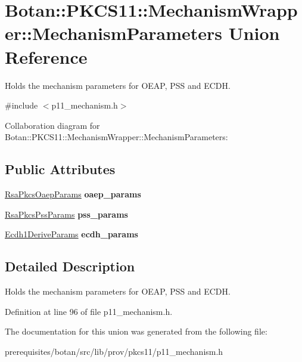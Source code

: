 \hypertarget{union_botan_1_1_p_k_c_s11_1_1_mechanism_wrapper_1_1_mechanism_parameters}{}\section{Botan\+:\+:P\+K\+C\+S11\+:\+:Mechanism\+Wrapper\+:\+:Mechanism\+Parameters Union Reference}
\label{union_botan_1_1_p_k_c_s11_1_1_mechanism_wrapper_1_1_mechanism_parameters}


Holds the mechanism parameters for O\+E\+AP, P\+SS and E\+C\+DH.  




{\ttfamily \#include $<$p11\+\_\+mechanism.\+h$>$}



Collaboration diagram for Botan\+:\+:P\+K\+C\+S11\+:\+:Mechanism\+Wrapper\+:\+:Mechanism\+Parameters\+:
\subsection*{Public Attributes}
\begin{DoxyCompactItemize}
\item 
\mbox{\label{union_botan_1_1_p_k_c_s11_1_1_mechanism_wrapper_1_1_mechanism_parameters_a9aee05d69e94972c32e7336b3aac55c9}} 
\mbox{\hyperlink{struct_c_k___r_s_a___p_k_c_s___o_a_e_p___p_a_r_a_m_s}{Rsa\+Pkcs\+Oaep\+Params}} {\bfseries oaep\+\_\+params}
\item 
\mbox{\label{union_botan_1_1_p_k_c_s11_1_1_mechanism_wrapper_1_1_mechanism_parameters_a0482e4d40faec418db66b03a24d37ede}} 
\mbox{\hyperlink{struct_c_k___r_s_a___p_k_c_s___p_s_s___p_a_r_a_m_s}{Rsa\+Pkcs\+Pss\+Params}} {\bfseries pss\+\_\+params}
\item 
\mbox{\label{union_botan_1_1_p_k_c_s11_1_1_mechanism_wrapper_1_1_mechanism_parameters_a904692aae0fb88a8176c071e0b8de600}} 
\mbox{\hyperlink{struct_c_k___e_c_d_h1___d_e_r_i_v_e___p_a_r_a_m_s}{Ecdh1\+Derive\+Params}} {\bfseries ecdh\+\_\+params}
\end{DoxyCompactItemize}


\subsection{Detailed Description}
Holds the mechanism parameters for O\+E\+AP, P\+SS and E\+C\+DH. 

Definition at line 96 of file p11\+\_\+mechanism.\+h.



The documentation for this union was generated from the following file\+:\begin{DoxyCompactItemize}
\item 
prerequisites/botan/src/lib/prov/pkcs11/p11\+\_\+mechanism.\+h\end{DoxyCompactItemize}
